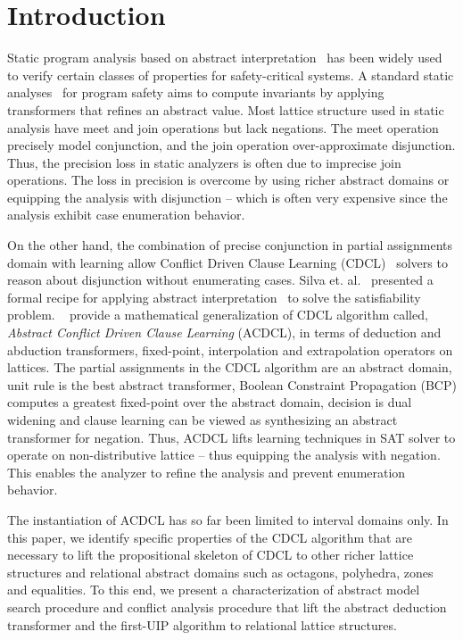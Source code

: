 \section{Introduction}
%
Static program analysis based on abstract 
interpretation~\cite{DBLP:conf/emsoft/Cousot07} has been widely used to
verify certain classes of properties for safety-critical systems.  A 
standard static analyses~\cite{se2011} for program safety aims to compute 
invariants by applying transformers that refines an abstract 
value.  Most lattice structure used in static analysis have 
meet and join operations but lack negations.  The meet operation 
precisely model conjunction, and the join operation over-approximate 
disjunction. Thus, the precision loss in static analyzers is often 
due to imprecise join operations. The loss in precision is overcome 
by using richer abstract domains or equipping the analysis with disjunction --
which is often very expensive since the analysis exhibit case enumeration 
behavior. 

On the other hand, the combination of precise conjunction in partial assignments 
domain with learning allow Conflict Driven Clause Learning (CDCL)~\cite{cdcl} 
solvers to reason about disjunction without enumerating cases.  
Silva et. al.~\cite{tacas12, sas12, dhk2013-popl} presented 
a formal recipe for applying abstract interpretation~\cite{se2011} to solve the 
satisfiability problem.  ~\cite{sas12} provide a mathematical generalization 
of CDCL algorithm called, {\em Abstract Conflict Driven Clause Learning} (ACDCL), 
in terms of deduction and abduction transformers, fixed-point, interpolation 
and extrapolation operators on lattices.  The partial assignments in the 
CDCL algorithm are an abstract domain, unit rule is the best abstract 
transformer,  Boolean Constraint Propagation (BCP) computes a greatest fixed-point 
over the abstract domain, decision is dual widening and clause learning can be 
viewed as synthesizing an abstract transformer for negation.  Thus, ACDCL 
lifts learning techniques in SAT solver to operate on non-distributive 
lattice -- thus equipping the analysis with negation. This enables the 
analyzer to refine the analysis and prevent enumeration behavior.

The instantiation of ACDCL has so far been limited to interval domains only.  
In this paper, we identify specific properties of the CDCL algorithm that 
are necessary to lift the propositional skeleton of CDCL to other richer 
lattice structures and relational abstract domains such as octagons, 
polyhedra, zones and equalities.  To this end, we present a 
characterization of abstract model search procedure and conflict 
analysis procedure that lift the abstract deduction transformer and the 
first-UIP algorithm to relational lattice structures. 

